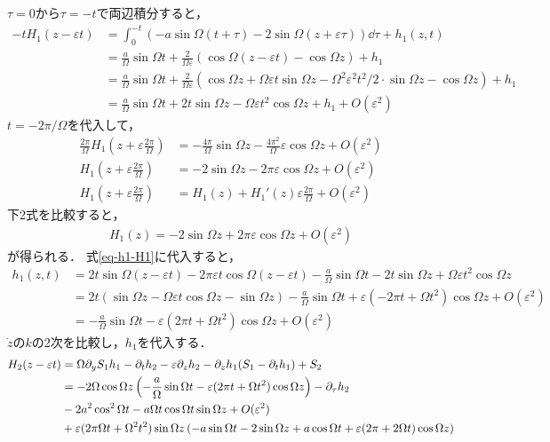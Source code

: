 \documentclass[../main]{subfiles}
\begin{document}
    $\tau=0$から$\tau=-t$で両辺積分すると，
    \begin{align}
        -tH_1(z-\varepsilon t)&=\int_0^{-t}\left(-a\sin\Omega(t+\tau)-2\sin\Omega(z+\varepsilon\tau)\right)\dd{\tau}+h_1(z,t)\\
        &=\frac{a}{\Omega}\sin\Omega t+\frac{2}{\Omega \varepsilon}(\cos \Omega (z-\varepsilon t)-\cos \Omega z)+h_1\\
        &=\frac{a}{\Omega}\sin\Omega t+\frac{2}{\Omega \varepsilon}(\cos \Omega z+\Omega \varepsilon t\sin \Omega z-\Omega^2\varepsilon^2t^2/2\cdot\sin \Omega z-\cos \Omega z)+h_1\\
        &=\frac{a}{\Omega}\sin\Omega t+2t\sin \Omega z-\Omega\varepsilon t^2\cos \Omega z+h_1+O(\varepsilon^2)
        \label{eq-h1-H1}
    \end{align}
    $t=-2\pi/\Omega$を代入して，
    \begin{align*}
        \frac{2\pi}{\Omega}H_1\left(z+\varepsilon\frac{2\pi}{\Omega}\right)&=-\frac{4\pi}{\Omega}\sin\Omega z-\frac{4\pi^2}{\Omega}\varepsilon \cos \Omega z+O(\varepsilon^2)\\
        H_1\left(z+\varepsilon\frac{2\pi}{\Omega}\right)&=-2 \sin\Omega z-2\pi\varepsilon \cos \Omega z+O(\varepsilon^2)\\
        H_1\left(z+\varepsilon\frac{2\pi}{\Omega}\right)&=H_1(z)+H_1'(z)\varepsilon\frac{2\pi}{\Omega}+O(\varepsilon^2)
    \end{align*}
    下2式を比較すると，
    \begin{align*}
        H_1(z)=-2\sin\Omega z+2\pi\varepsilon \cos\Omega z+O(\varepsilon^2)
    \end{align*}
    が得られる．
    式\eqref{eq-h1-H1}に代入すると，
    \begin{align*}
        h_1(z,t)&=2t\sin\Omega(z-\varepsilon t)-2\pi\varepsilon t\cos\Omega(z-\varepsilon t)-\frac{a}{\Omega}\sin\Omega t-2t\sin \Omega z+\Omega\varepsilon t^2\cos \Omega z\\
        &=2t(\sin\Omega z-\Omega \varepsilon t\cos\Omega z-\sin\Omega z)-\frac{a}{\Omega}\sin\Omega t+\varepsilon(-2\pi t+\Omega t^2)\cos \Omega z+O(\varepsilon^2)\\
        &=-\frac{a}{\Omega}\sin\Omega t-\varepsilon(2\pi t+\Omega t^2)\cos \Omega z+O(\varepsilon^2)
    \end{align*}
    $\dot{z}のk$の2次を比較し，$h_1$を代入する．
    \begin{align*}
        H_2(z-\varepsilon t)&=\Omega \partial_y S_1h_1 -\partial_th_2-\varepsilon\partial_zh_2 -\partial_zh_1(S_1-\partial_th_1)+S_2\\
        &=-2\Omega \cos \Omega z\left( -\frac{a}{\Omega}\sin\Omega t-\varepsilon(2\pi t+\Omega t^2) \cos \Omega z \right)-\partial_\tau h_2\\
        &-2a^2\cos^2\Omega t-a\Omega t\cos \Omega t\sin \Omega z+O(\varepsilon^2)\\
        &+\varepsilon(2\pi\Omega t+\Omega^2 t^2)\sin\Omega z \left( -a\sin\Omega t-2\sin\Omega z +a\cos\Omega t+\varepsilon(2\pi +2\Omega t)\cos\Omega z\right)
    \end{align*}
\end{document}
